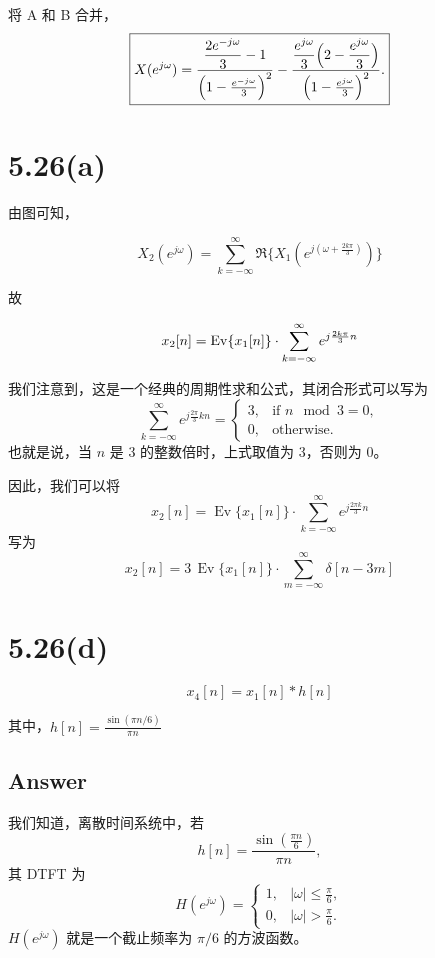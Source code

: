 \documentclass[11pt]{article}
\begin{document}
将 A 和 B 合并， \[
\boxed{
X(e^{j\omega})=\frac{\displaystyle \frac{2e^{-j\omega}}{3}-1}{\Bigl(1-\frac{e^{-j\omega}}{3}\Bigr)^2}
-\frac{\displaystyle \frac{e^{j\omega}}{3}\Bigl(2-\frac{e^{j\omega}}{3}\Bigr)}{\Bigl(1-\frac{e^{j\omega}}{3}\Bigr)^2}.}
\]

    \section{5.26(a)}\label{a}

由图可知，

\[
X_2(e^{j\omega}) = \sum_{k = -\infty}^\infty\Re\{X_1(e^{j(\omega + \frac{2k\pi}{3})})\}
\]

故

\[
x_2[n] = {\rm Ev}\{ x_1[n] \} \cdot \sum_{k = -\infty}^\infty e^{j\frac{2k\pi}{3}n}
\]

我们注意到，这是一个经典的周期性求和公式，其闭合形式可以写为 \[
\sum_{k=-\infty}^{\infty} e^{j\frac{2\pi}{3}kn} =
\begin{cases}
3, & \text{if } n \mod 3 = 0, \\
0, & \text{otherwise.}
\end{cases}
\] 也就是说，当 \(n\) 是 3 的整数倍时，上式取值为 3，否则为 0。

因此，我们可以将 \[
x_2[n] = \operatorname{Ev}\{ x_1[n] \} \cdot \sum_{k=-\infty}^{\infty} e^{j\frac{2\pi k}{3}n}
\] 写为 \[
x_2[n] = 3\,\operatorname{Ev}\{ x_1[n] \}\cdot \sum_{m=-\infty}^{\infty} \delta[n-3m]
\]

    \section{5.26(d)}\label{d}

\[
x_4[n] = x_1[n] * h[n]
\]

其中，\(h[n] = \frac{\sin (\pi n /6)}{\pi n}\)

\subsection{Answer}\label{answer}

我们知道，离散时间系统中，若 \[
h[n] = \frac{\sin\left(\frac{\pi n}{6}\right)}{\pi n},
\] 其 DTFT 为 \[
H(e^{j\omega}) = \begin{cases}
1, & |\omega|\le \frac{\pi}{6},\\[1mm]
0, & |\omega|>\frac{\pi}{6}.
\end{cases}
\] \(H(e^{j\omega})\) 就是一个截止频率为 \(\pi/6\) 的方波函数。
\end{document}
